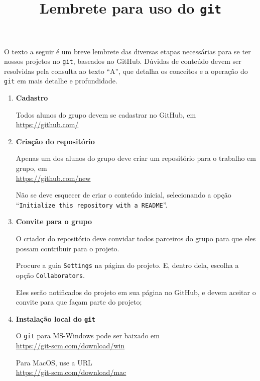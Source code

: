 \documentclass[10pt,a4paper]{article}
\title{Lembrete para uso do {\tt git}}
\begin{document}
\maketitle


\noindent
O texto a seguir é um breve lembrete das diversas etapas necessárias para se ter nossos projetos no {\tt git}, baseados no GitHub. Dúvidas de conteúdo devem ser resolvidas pela consulta ao texto ``A'', que detalha os conceitos e a operação do {\tt git} em mais detalhe e profundidade.

\begin{enumerate}
	\item {\bf Cadastro}

		Todos alunos do grupo devem se cadastrar no GitHub, em \\
		\url{https://github.com/}

	\item {\bf Criação do repositório}

		Apenas um dos alunos do grupo deve criar um repositório para o trabalho em grupo, em \\
		\url{https://github.com/new}

		Não se deve esquecer de criar o conteúdo inicial, selecionando a opção \\
		``{\tt Initialize this repository with a README}''. 
                
	\item {\bf Convite para o grupo}

		O criador do repositório deve convidar todos parceiros do grupo para que eles possam contribuir para o projeto. 
		
		Procure a guia {\tt Settings} na página do projeto. E, dentro dela, escolha a opção  {\tt Collaborators}.

		Eles serão notificados do projeto em sua página no GitHub, e devem aceitar o convite para que façam parte do projeto;
                
	\item {\bf Instalação local do {\tt git}}
	
		O {\tt git} para MS-Windows pode ser baixado em \\
		\url{https://git-scm.com/download/win}

		Para MacOS, use a URL\\
        \url{https://git-scm.com/download/mac}


\end{enumerate}
\end{document}
